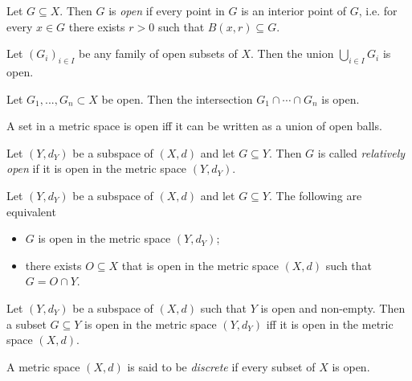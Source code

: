 \documentclass{article}
\begin{document}
\begin{definition}
	Let $G\subseteq X$. Then $G$ is \emph{open} if
	every point in $G$ is an interior point of $G$, i.e. for every $x\in G$ there exists
	$r>0$ such that $B(x,r)\subseteq G$.
\end{definition}

\begin{theorem}[4.6]
	Let $(G_i)_{i\in I}$ be any family of open subsets of $X$. Then the union
	$\bigcup_{i\in I} G_i$ is open.
\end{theorem}

\begin{theorem}[4.7]
	Let $G_1,...,G_n\subset X$ be open. Then the intersection $G_1\cap\cdots\cap G_n$
	is open.
\end{theorem}

\begin{proposition}[4.9]
	A set in a metric space is open iff it can be written as a union of open balls.
\end{proposition}

\begin{definition}
	Let $(Y,d_Y)$ be a subspace of $(X,d)$ and let $G\subseteq Y$. Then $G$ is called
	\emph{relatively open} if it is open in the metric space $(Y,d_Y)$.
\end{definition}

\begin{proposition}[4.10]
	Let $(Y,d_Y)$ be a subspace of $(X,d)$ and let $G\subseteq Y$. The following
	are equivalent
	\begin{itemize}
		\item $G$ is open in the metric space $(Y,d_Y)$;
		\item there exists $O\subseteq X$ that is open in the metric space $(X,d)$ such that $G=O\cap Y$.
	\end{itemize}
\end{proposition}

\begin{proposition}[Exercise 4.11]
	Let $(Y,d_Y)$ be a subspace of $(X,d)$ such that $Y$ is open and non-empty. Then a
	subset $G\subseteq Y$ is open in the metric space $(Y,d_Y)$ iff it is open in the
	metric space $(X,d)$.
\end{proposition}

\begin{definition}
	A metric space $(X,d)$ is said to be \emph{discrete} if every subset of $X$ is open.
\end{definition}
\end{document}
